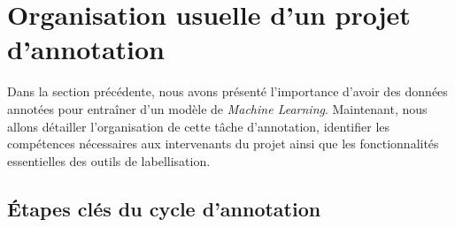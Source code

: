 \section{Organisation usuelle d'un projet d'annotation}
\label{section:2.2-ORGANISATION-ANNOTATION}
	
	Dans la section précédente, nous avons présenté l'importance d'avoir des données annotées pour entraîner d'un modèle de \textit{Machine Learning}.
	Maintenant, nous allons détailler l'organisation de cette tâche d'annotation, identifier les compétences nécessaires aux intervenants du projet ainsi que les fonctionnalités essentielles des outils de labellisation.
	
	
	\subsection{Étapes clés du cycle d'annotation}
	\label{section:2.2.1-ORGANISATION-ANNOTATION-ETAPES-CLES}
		
